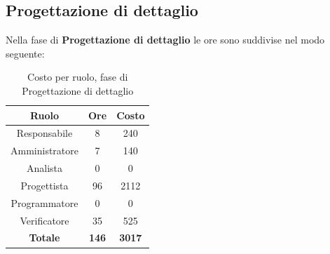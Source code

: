 \subsection{Progettazione di dettaglio}
Nella fase di \textbf{Progettazione di dettaglio} le ore sono suddivise nel modo seguente:
\begin{table}[H]
	\centering
	\begin{tabular}{|c|c|c|}
		\hline
		\textbf{Ruolo} &
		\textbf{Ore} &
		\textbf{Costo} \\
		\hline
		Responsabile & 8 & 240 \\
		\hline
		Amministratore & 7 & 140 \\
		\hline
		Analista & 0 & 0\\
		\hline
		Progettista & 96 & 2112 \\
		\hline
		Programmatore & 0 & 0 \\
		\hline
		Verificatore & 35 & 525 \\
		\hline
		\textbf{Totale} & \textbf{146} & \textbf{3017} \\
		\hline
	\end{tabular}
	\caption{Costo per ruolo, fase di Progettazione di dettaglio}
\end{table}

